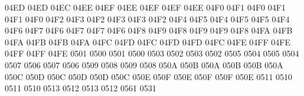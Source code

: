 \setcclcucx 04ED 04ED 04EC %
\setcclcucx 04EE 04EF 04EE %
\setcclcucx 04EF 04EF 04EE %
\setcclcucx 04F0 04F1 04F0 %
\setcclcucx 04F1 04F1 04F0 %
\setcclcucx 04F2 04F3 04F2 %
\setcclcucx 04F3 04F3 04F2 %
\setcclcucx 04F4 04F5 04F4 %
\setcclcucx 04F5 04F5 04F4 %
\setcclcucx 04F6 04F7 04F6 %
\setcclcucx 04F7 04F7 04F6 %
\setcclcucx 04F8 04F9 04F8 %
\setcclcucx 04F9 04F9 04F8 %
\setcclcucx 04FA 04FB 04FA %
\setcclcucx 04FB 04FB 04FA %
\setcclcucx 04FC 04FD 04FC %
\setcclcucx 04FD 04FD 04FC %
\setcclcucx 04FE 04FF 04FE %
\setcclcucx 04FF 04FF 04FE %
 0501 0500 %
 0501 0500 %
 0503 0502 %
 0503 0502 %
 0505 0504 %
 0505 0504 %
 0507 0506 %
 0507 0506 %
 0509 0508 %
 0509 0508 %
\setcclcucx 050A 050B 050A %
\setcclcucx 050B 050B 050A %
\setcclcucx 050C 050D 050C %
\setcclcucx 050D 050D 050C %
\setcclcucx 050E 050F 050E %
\setcclcucx 050F 050F 050E %
 0511 0510 %
 0511 0510 %
 0513 0512 %
 0513 0512 %
 0561 0531 %
